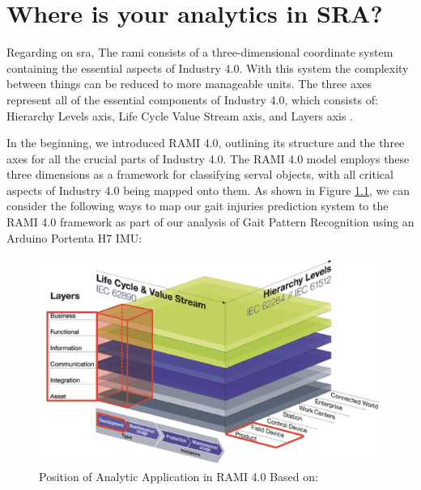 \chapter{Where is your analytics in SRA?}


Regarding on \ac{sra}, The \ac{rami} consists of a three-dimensional coordinate system containing the essential aspects of Industry 4.0. With this system the complexity between things can be reduced to more manageable units. The three axes represent all of the essential components of Industry 4.0, which consists of: Hierarchy Levels axis, Life Cycle Value Stream axis, and Layers axis \cite{Hankel2015}.

\bigskip

In the beginning, we introduced RAMI 4.0, outlining its structure and the three axes for all the crucial parts of Industry 4.0. The RAMI 4.0 model employs these three dimensions as a framework for classifying serval objects, with all critical aspects of Industry 4.0 being mapped onto them. As shown in Figure \ref{fig:Position of Analytic Application in RAMI 4.0}, we can consider the following ways to map our gait injuries prediction system to the RAMI 4.0 framework as part of our analysis of Gait Pattern Recognition using an Arduino Portenta H7 IMU:

\begin{figure}[ht]
    \centering
    \includegraphics[scale=0.15]{Images/Position of Analytic Application in RAMI4.jpg}
    \captionsetup{justification=centering}
    \caption{Position of Analytic Application in RAMI 4.0 Based on: \cite{Hankel2015}}
    \label{fig:Position of Analytic Application in RAMI 4.0}
\end{figure}

